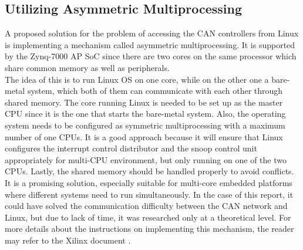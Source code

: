 \subsection*{Utilizing Asymmetric Multiprocessing}

A proposed solution for the problem of accessing the CAN controllers from Linux is implementing a mechanism called asymmetric multiprocessing.
It is supported by the Zynq-7000 AP SoC since there are two cores on the same processor which share common memory as well as peripherals.\\

The idea of this is to run Linux OS on one core, while on the other one a bare-metal system, which both of them can communicate with each other through shared memory. The core running Linux is needed to be set up as the master CPU since it is the one that starts the bare-metal system. Also, the operating system needs to be configured as symmetric multiprocessing with a maximum number of one CPUs.
It is a good approach because it will ensure that Linux configures the interrupt control distributor and the snoop control unit appropriately for multi-CPU environment, but only running on one of the two CPUs. Lastly, the shared memory should be handled properly to avoid conflicts.\\

It is a promising solution, especially suitable for multi-core embedded platforms where different systems need to run simultaneously. In the case of this report, it could have solved the communication difficulty between the CAN network and Linux, but due to lack of time, it was researched only at a theoretical level. For more details about the instructions on implementing this mechanism, the reader may refer to the Xilinx document \cite{Xilinx_AMP}.
